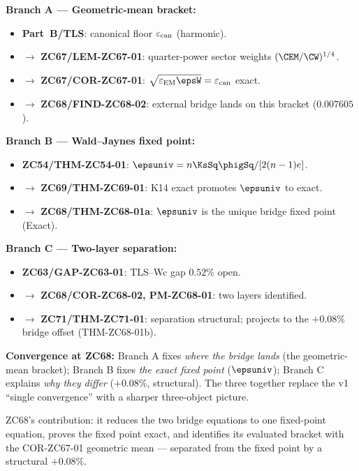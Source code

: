 \documentclass[12pt, a4paper]{article}
\renewcommand{\epsEM}{\varepsilon_{\rm EM}}
\renewcommand{\epscan}{\varepsilon_{\rm can}}
\begin{document}
\begin{genealogybox}[title={How ZC68's Key Objects Trace Back}]

\textbf{Branch A --- Geometric-mean bracket:}
\begin{itemize}[leftmargin=2em, noitemsep]
  \item \textbf{Part~B/TLS}: canonical floor $\epscan$ (harmonic).
  \item $\to$ \textbf{ZC67/LEM-ZC67-01}: quarter-power sector weights
    $(\CEM/\CW)^{1/4}$.
  \item $\to$ \textbf{ZC67/COR-ZC67-01}: $\sqrt{\epsEM\epsW}=\epscan$ exact.
  \item $\to$ \textbf{ZC68/FIND-ZC68-02}: external bridge lands on this
    bracket ($0.007605$).
\end{itemize}

\textbf{Branch B --- Wald--Jaynes fixed point:}
\begin{itemize}[leftmargin=2em, noitemsep]
  \item \textbf{ZC54/THM-ZC54-01}: $\epsuniv=n\KsSq\phigSq/[2(n-1)e]$.
  \item $\to$ \textbf{ZC69/THM-ZC69-01}: K14 exact promotes $\epsuniv$
    to exact.
  \item $\to$ \textbf{ZC68/THM-ZC68-01a}: $\epsuniv$ is the unique bridge
    fixed point (Exact).
\end{itemize}

\textbf{Branch C --- Two-layer separation:}
\begin{itemize}[leftmargin=2em, noitemsep]
  \item \textbf{ZC63/GAP-ZC63-01}: TLS--Wc gap $0.52\%$ open.
  \item $\to$ \textbf{ZC68/COR-ZC68-02, PM-ZC68-01}: two layers identified.
  \item $\to$ \textbf{ZC71/THM-ZC71-01}: separation structural;
    projects to the $+0.08\%$ bridge offset (THM-ZC68-01b).
\end{itemize}

\textbf{Convergence at ZC68:}
Branch A fixes \emph{where the bridge lands} (the geometric-mean
bracket); Branch B fixes \emph{the exact fixed point} ($\epsuniv$);
Branch C explains \emph{why they differ} ($+0.08\%$, structural). The
three together replace the v1 ``single convergence'' with a sharper
three-object picture.

ZC68's contribution: it reduces the two bridge equations to one
fixed-point equation, proves the fixed point exact, and identifies its
evaluated bracket with the COR-ZC67-01 geometric mean --- separated from
the fixed point by a structural $+0.08\%$.
\end{genealogybox}
\end{document}
